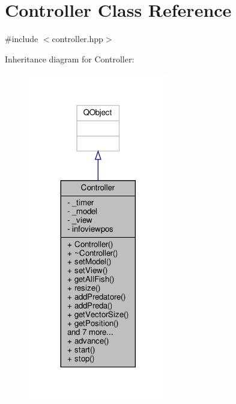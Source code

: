 \hypertarget{classController}{}\section{Controller Class Reference}
\label{classController}


{\ttfamily \#include $<$controller.\+hpp$>$}



Inheritance diagram for Controller\+:\nopagebreak
\begin{figure}[H]
\begin{center}
\leavevmode
\includegraphics[width=173pt]{classController__inherit__graph}
\end{center}
\end{figure}


